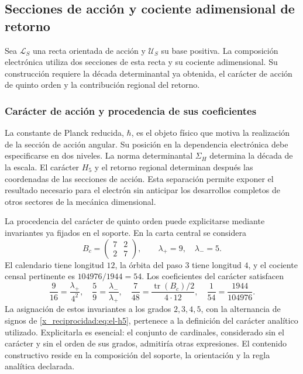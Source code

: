 \subsection{Secciones de acción y cociente adimensional de retorno}

Sea \(\mathcal L_S\) una recta orientada de acción y \(\mathcal U_S\)
su base positiva. La composición electrónica utiliza dos secciones de
esta recta y su cociente adimensional. Su construcción requiere la
década determinantal ya obtenida, el carácter de acción de quinto orden
y la contribución regional del retorno.

\subsubsection{Carácter de acción y procedencia de sus coeficientes}
\label{x_reciprocidad:sec:revision-planck}

La constante de Planck reducida, \(\hbar\), es el objeto físico que
motiva la realización de la sección de acción angular. Su posición en
la dependencia electrónica debe especificarse en dos niveles. La norma
determinantal \(\Sigma_H\) determina la década de la escala. El carácter
\(H_5\) y el retorno regional determinan después las coordenadas de las
secciones de acción. Esta separación permite exponer el resultado
necesario para el electrón sin anticipar los desarrollos completos de
otros sectores de la mecánica dimensional.

La procedencia del carácter de quinto orden puede explicitarse mediante
invariantes ya fijados en el soporte. En la carta central se considera
\[
 B_c=\begin{pmatrix}7&2\\2&7\end{pmatrix},
 \qquad \lambda_+=9,\quad\lambda_-=5.
\]
El calendario tiene longitud \(12\), la órbita del paso \(3\) tiene
longitud \(4\), y el cociente censal pertinente es
\(104976/1944=54\). Los coeficientes del carácter satisfacen
\begin{equation}
 \frac9{16}=\frac{\lambda_+}{4^2},\quad
 \frac59=\frac{\lambda_-}{\lambda_+},\quad
 \frac7{48}=\frac{\operatorname{tr}(B_c)/2}{4\cdot12},\quad
 \frac1{54}=\frac{1944}{104976}.
 \label{x_reciprocidad:eq:revision-h5-coeficientes}
\end{equation}
La asignación de estos invariantes a los grados \(2,3,4,5\), con la
alternancia de signos de \eqref{x_reciprocidad:eq:el-h5}, pertenece a la definición del
carácter analítico utilizado. Explicitarla es esencial: el conjunto de
cardinales, considerado sin el carácter y sin el orden de sus grados,
admitiría otras expresiones. El contenido constructivo reside en la
composición del soporte, la orientación y la regla analítica declarada.

